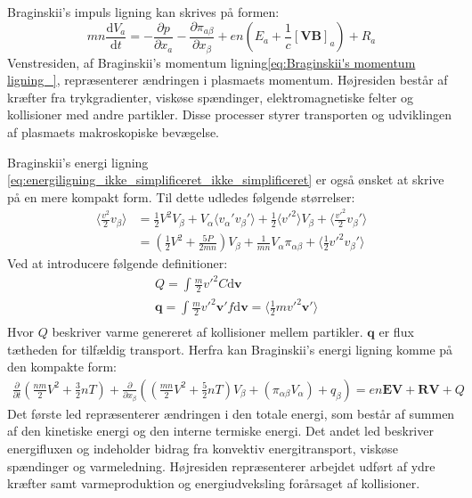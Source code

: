 Braginskii's impuls ligning kan skrives på formen:
\begin{equation}
    mn\frac{\mathrm{d}V_a}{\mathrm{d}t} = - \frac{\partial p}{\partial x_a} - \frac{\partial \pi_{a\beta}}{\partial x_\beta}
    + en\left(E_a + \frac{1}{c} \left[\mathbf{VB}\right]_a\right) + R_a \label{eq:Braginskii's momentum ligning_}
\end{equation}
Venstresiden, af Braginskii's momentum ligning\eqref{eq:Braginskii's momentum ligning_}, repræsenterer ændringen i plasmaets momentum.
Højresiden består af kræfter fra trykgradienter, viskøse spændinger, elektromagnetiske felter og kollisioner med andre partikler.
Disse processer styrer transporten og udviklingen af plasmaets makroskopiske bevægelse.

Braginskii's energi ligning \eqref{eq:energiligning_ikke_simplificeret_ikke_simplificeret} er også 
ønsket at skrive på en mere kompakt form. Til dette udledes følgende størrelser:
\begin{align*}
    \langle \frac{v^2}{2} v_\beta \rangle &= \frac{1}{2} V^2 V_\beta + V_\alpha 
    \langle v_\alpha' v_\beta' \rangle + \frac{1}{2} \langle v'^2 \rangle V_\beta +
    \langle \frac{v'^2}{2} v_\beta' \rangle \\
    &= \left( \frac{1}{2} V^2 + \frac{5P}{2mn} \right) V_\beta + 
    \frac{1}{mn} V_\alpha \pi_{\alpha\beta}  + \langle \frac{1}{2} v'^2 v_\beta' \rangle
\end{align*}
Ved at introducere følgende definitioner:
\begin{align*}
    &Q = \int \frac{m}{2} v'^2 C \mathrm{d}\mathbf{v}\\
    &\mathbf{q} = \int \frac{m}{2} v'^2 \mathbf{v}' f \mathrm{d}\mathbf{v} = \langle \frac{1}{2} m v'^2 \mathbf{v}' \rangle \\
\end{align*}
Hvor $Q$ beskriver varme genereret af kollisioner mellem partikler. $\mathbf{q}$ er flux tætheden for tilfældig transport.
Herfra kan Braginskii's energi ligning komme på den kompakte form:
\begin{align}
    \frac{\partial}{\partial t}\left(\frac{nm}{2}  V^2 + \frac{3}{2} n T\right) +
    \frac{\partial}{\partial x_\beta} \left( \left(\frac{mn}{2}V^2  +\frac{5}{2} nT\right)V_\beta +
    \left(\pi_{\alpha \beta} V_\alpha \right) + q_\beta \right) = en\mathbf{EV} + \mathbf{RV} + Q  \label{eq:Braginskii's energi ligning_}
\end{align}
Det første led repræsenterer ændringen i den totale energi, som består af summen af den kinetiske energi og den interne termiske energi. 
Det andet led beskriver energifluxen og indeholder bidrag fra konvektiv energitransport, viskøse spændinger og varmeledning.
Højresiden repræsenterer arbejdet udført af ydre kræfter samt varmeproduktion og energiudveksling forårsaget af kollisioner.

